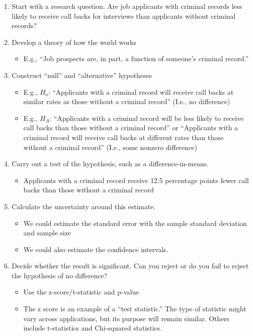\documentclass[
  letterpaper,
  DIV=11,
  numbers=noendperiod]{scrreprt}
\providecommand{\tightlist}{%
  \setlength{\itemsep}{0pt}\setlength{\parskip}{0pt}}\usepackage{longtable,booktabs,array}
\begin{document}
\begin{enumerate}
\def\labelenumi{\arabic{enumi}.}
\tightlist
\item
  Start with a research question: Are job applicants with criminal
  records less likely to receive call backs for interviews than
  applicants without criminal records?
\item
  Develop a theory of how the world works

  \begin{itemize}
  \tightlist
  \item
    E.g., ``Job prospects are, in part, a function of someone's criminal
    record.''
  \end{itemize}
\item
  Construct ``null'' and ``alternative'' hypotheses

  \begin{itemize}
  \tightlist
  \item
    E.g., \(H_o\): ``Applicants with a criminal record will receive call
    backs at similar rates as those without a criminal record'' (I.e.,
    no difference)
  \item
    E.g., \(H_A\): ``Applicants with a criminal record will be less
    likely to receive call backs than those without a criminal record''
    or ``Applicants with a criminal record will receive call backs at
    different rates than those without a criminal record'' (I.e., some
    nonzero difference)
  \end{itemize}
\item
  Carry out a test of the hypothesis, such as a difference-in-means.

  \begin{itemize}
  \tightlist
  \item
    Applicants with a criminal record receive 12.5 percentage points
    fewer call backs than those without a criminal record
  \end{itemize}
\item
  Calculate the uncertainty around this estimate.

  \begin{itemize}
  \tightlist
  \item
    We could estimate the standard error with the sample standard
    deviation and sample size
  \item
    We could also estimate the confidence intervals.
  \end{itemize}
\item
  Decide whether the result is significant. Can you reject or do you
  fail to reject the hypothesis of no difference?

  \begin{itemize}
  \tightlist
  \item
    Use the z-score/t-statistic and p-value
  \item
    The z score is an example of a ``test statistic.'' The type of
    statistic might vary across applications, but its purpose will
    remain similar. Others include t-statistics and Chi-squared
    statistics.
  \end{itemize}
\end{enumerate}
\end{document}
